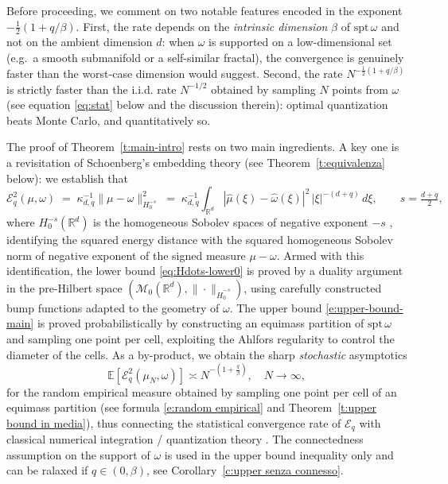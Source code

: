 \documentclass[12pt,a4paper,oneside]{amsart}
\theoremstyle{plain}
\theoremstyle{definition}
\numberwithin{equation}{section}
\numberwithin{figure}{section}
\numberwithin{table}{section}
\theoremstyle{remark}
\newcommand{\R}{\mathbb{R}}
\newcommand{\E}{\mathbb{E}}
\newcommand{\expAhlfors}{\beta}
\begin{document}
Before proceeding, we comment on two notable features encoded in the exponent $-\frac{1}{2}(1+q/\expAhlfors)$. First, the rate depends on the \emph{intrinsic dimension} $\expAhlfors$ of $\mathrm{spt}\,\omega$ and not on the ambient dimension $d$: when $\omega$ is supported on a low-dimensional set (e.g.\ a smooth submanifold or a self-similar fractal), the convergence is genuinely faster than the worst-case dimension would suggest. Second, the rate $N^{-\frac{1}{2}(1+q/\expAhlfors)}$ is strictly faster than the i.i.d. rate $N^{-1/2}$ obtained by sampling $N$ points from $\omega$ (see equation \eqref{eq:stat} below and the discussion therein): optimal quantization beats Monte Carlo, and quantitatively so.

The proof of Theorem~\ref{t:main-intro} rests on two main ingredients. A key one is a revisitation of Schoenberg's embedding theory (see Theorem~\ref{t:equivalenza} below): we establish that
\begin{equation}\label{eq:equiv}
  \mathcal E_q^2(\mu, \omega)
  \;=\; \kappa_{d,q}^{-1}
  \|\mu - \omega\|^2_{{H}^{-s}_0}
  \;=\;
\kappa_{d,q}^{-1} \int_{\R^d}
  |\hat{\mu}(\xi) - \hat{\omega}(\xi)|^2
  \,|\xi|^{-(d+q)}\, d\xi,
  \qquad s = \tfrac{d+q}{2},
\end{equation}
where ${H}^{-s}_0(\R^d)$ is the homogeneous Sobolev spaces of negative exponent $-s$ \cite{auricchio2026kinetic, fornasier2014consistency, szekely2023energy},
identifying the squared energy distance with the squared homogeneous Sobolev norm of negative exponent of the signed measure $\mu-\omega$. Armed with this identification, the lower bound \eqref{eq:Hdots-lower0} is proved by a duality argument in the pre-Hilbert space $(\mathcal{M}_0(\R^d),\|\cdot\|_{\dot H^{-s}_0})$, using carefully constructed bump functions adapted to the geometry of $\omega$. The upper bound \eqref{e:upper-bound-main} is proved probabilistically by constructing an equimass partition of $\mathrm{spt}\,\omega$ and sampling one point per cell, exploiting the Ahlfors regularity to control the diameter of the cells. As a by-product, we obtain the sharp \emph{stochastic} asymptotics
\begin{equation*}
\E [\mathcal{E}^2_q(\mu_N,\omega)]  \asymp N^{-(1+\frac{q}{\expAhlfors})}, \quad N \to \infty,
\end{equation*}
for the random empirical measure obtained by sampling one point per cell of an equimass partition (see formula \eqref{e:random empirical} and Theorem~\ref{t:upper bound in media}), thus connecting the statistical convergence rate of $\mathcal E_q$ with classical numerical integration / quantization theory \cite{GrafLuschgy}. The connectedness assumption on the support of $\omega$ is used in the upper bound inequality only and can be ralaxed if $q \in (0, \expAhlfors)$, see Corollary~\ref{c:upper senza connesso}.\\
\end{document}
